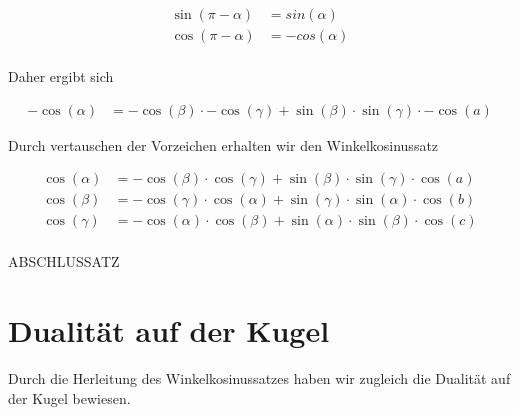 \begin{refsection}
\begin{align*}
\sin (\pi-\alpha) &= sin(\alpha)\\
\cos (\pi-\alpha) &= - cos (\alpha)\\
\end{align*}

Daher ergibt sich

\begin{align*}
{-\cos (\alpha)} &= {-\cos (\beta)} \cdot {-\cos (\gamma)} + {\sin(\beta)} \cdot {\sin(\gamma)} \cdot {-\cos (a)}
\end{align*}

Durch vertauschen der Vorzeichen erhalten wir den Winkelkosinussatz

\begin{satz}
\label{skript:kugel:satz:Winkelkosinussatz}
\end{satz}

\begin{align*}
{\cos (\alpha)} &= {-\cos(\beta)} \cdot {\cos(\gamma)} + {\sin (\beta)} \cdot {\sin(\gamma)} \cdot {\cos(a)}\\
{\cos (\beta)} &= {-\cos(\gamma)} \cdot {\cos(\alpha)} + {\sin (\gamma)} \cdot {\sin(\alpha)} \cdot {\cos(b)}\\
{\cos (\gamma)} &= {-\cos(\alpha)} \cdot {\cos(\beta)} + {\sin (\alpha)} \cdot {\sin(\beta)} \cdot {\cos(c)}\\
\end{align*}

ABSCHLUSSATZ

\section{Dualität auf der Kugel}

Durch die Herleitung des Winkelkosinussatzes haben wir zugleich die Dualität auf der Kugel bewiesen.

\begin{satz}
\label{skript:kugel:satz:Dualitaet}
\end{satz}


\end{refsection}
